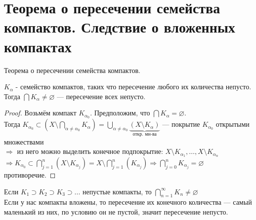 \section{Теорема о пересечении семейства компактов. Следствие о вложенных компактах}

\begin{theorem-non}
    Теорема о пересечении семейства компактов.

    $K_{\alpha}$ - семейство компактов, таких что пересечение любого их количества непусто.
    Тогда $\bigcap K_{\alpha} \neq \varnothing$ --- пересечение всех непусто.
    
    \begin{proof}
        Возьмём компакт $K_{\alpha_0}$. Предположим, что $\bigcap K_{\alpha} = \varnothing$. \\
        Тогда $K_{\alpha_0} \subset (X \setminus \bigcap\limits_{\alpha \neq \alpha_{0}} K_{\alpha}) = 
        \bigcup\limits_{\alpha \neq \alpha_{0}} \underbrace{(X \setminus K_{\alpha})}_\text{откр. мн-ва}$ --- покрытие $K_{\alpha_{0}}$ открытыми множествами \\
        $\Longrightarrow$ из него можно выделить конечное подпокрытие: $X \setminus K_{\alpha_{1}}, \dots, X \setminus K_{\alpha_{n}}$ \\
        $\Longrightarrow K_{\alpha_0} \subset \bigcap\limits_{j=1}^{n}(X \setminus K_{\alpha_{j}}) = X \setminus \bigcap\limits_{j = 1}^{n}(K_{\alpha_{j}}) \Longrightarrow
        \bigcap\limits_{j=0}^{n} K_{\alpha_{j}} = \varnothing$ противоречие. 
    \end{proof}

\end{theorem-non}

\follow \quad Если $K_1 \supset K_2 \supset K_3 \supset ...$ непустые компакты, то $\bigcap\limits_{n=1}^{\infty} K_n \neq \varnothing$ \\
Если у нас компакты вложены, то пересечение их конечного количества --- самый маленький из них, по условию он не пустой, значит пересечение непусто.